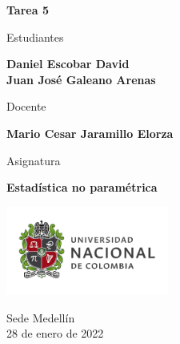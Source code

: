 \begin{titlepage}
   \Large{
   \begin{center}
       \vspace*{1cm}

       \textbf{Tarea 5}

            
       \vspace{1.5cm}
       
       Estudiantes
       
       \vspace{0.5cm}
        
        
       \textbf{Daniel Escobar David} \\

	\textbf{Juan José Galeano Arenas}

              \vspace{1cm}
       
       Docente
       
       \vspace{0.5cm}

       \textbf{Mario Cesar Jaramillo Elorza}
       
       \vspace{0.4cm}

       \vspace{1.4cm}
       
       Asignatura
       
       \vspace{0.5cm}

       \textbf{Estadística no paramétrica}

       \vfill

            
       \vspace{0.4cm}
     
       \includegraphics[width=0.4\textwidth]{logounal.png}
            
       Sede Medellín\\
       28 de enero de 2022
       
   \end{center}
   }
\end{titlepage}